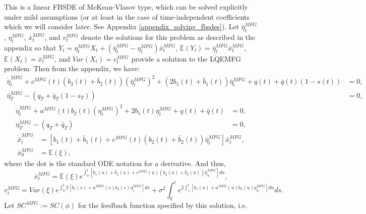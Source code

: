 \documentclass[11pt]{article}
\begin{document}
This is a linear FBSDE of McKean-Vlasov type, which can be solved explicitly under mild assumptions (or at least in the case of time-independent coefficients which we will consider later. See Appendix \ref{appendix_solving_fbsdes}). Let $\bar{\eta}_t^{MFG}$, $\eta_t^{MFG}$, $\bar{x}_t^{MFG}$, and $v^{MFG}_t$ denote the solutions for this problem as described in the appendix so that $Y_t=\eta_t^{MFG}X_t+(\bar{\eta}_t^{MFG}-\eta_t^{MFG})\bar{x}_t^{MFG}$, $\mathbb{E}(Y_t)=\bar{\eta}_t^{MFG}\bar{x}_t^{MFG}$, $\mathbb{E}(X_t)=\bar{x}_t^{MFG}$, and $Var(X_t)=v^{MFG}_t$ provide a solution to the LQEMFG problem. Then from the appendix, we have:
\begin{equation}
\begin{split}
\dot{\bar{\eta}}^{MFG}_t+c^{MFG}(t)(b_2(t)+\bar{b}_2(t)) (\bar{\eta}^{MFG}_t)^2+(2b_1(t)+\bar{b}_1(t)) \bar{\eta}^{MFG}_t +q(t)+\bar{q}(t)(1-s(t))&=0,\\
\bar{\eta}^{MFG}_T-(q_T+\bar{q}_T(1-s_T))&=0,
\end{split}
\label{eq:eta_bar_MFG}
\end{equation}
\begin{equation}
\begin{split}
\dot{\eta}^{MFG}_t+a^{MFG}(t)b_2(t)(\eta^{MFG}_t)^2+2b_1(t)\eta^{MFG}_t+q(t)+\bar{q}(t)&=0, \\
\eta^{MFG}_T-(q_T+\bar{q}_T)&=0,
\end{split}
\end{equation}
\begin{equation}
\begin{split}
\dot{\bar{x}}^{MFG}_t&=\left[b_1(t)+\bar{b}_1(t)+c^{MFG}(t)(b_2(t)+\bar{b}_2(t))\bar{\eta}^{MFG}_t\right]\bar{x}^{MFG}_t, \\
\bar{x}^{MFG}_0&=\mathbb{E}(\xi),
\end{split}
\label{eq:x_bar_MFG}
\end{equation}
where the dot is the standard ODE notation for a derivative. And thus,
\begin{equation}
\bar{x}^{MFG}_t=\mathbb{E}(\xi) e^{\int_0^t\left[b_1(u)+\bar{b}_1(u)+c^{MFG}(u)(b_2(u)+\bar{b}_2(u))\bar{\eta}^{MFG}_u\right]du},
\label{eq:x_bar_MFG_explicit}
\end{equation}
\begin{equation}
v^{MFG}_t=Var(\xi)e^{\int_0^t 2\left[b_1(s)+a^{MFG}(s)b_2(s)\eta^{MFG}_s\right]ds}+\sigma^2 \int_0^t e^{2 \int_s^t \left[b_1(u)+a^{MFG}(u)b_2(u)\eta^{MFG}_u\right] du}ds.
\label{eq:v_t}
\end{equation}
Let $SC^{MFG}:=SC(\phi)$ for the feedback function specified by this solution, i.e.
\end{document}
